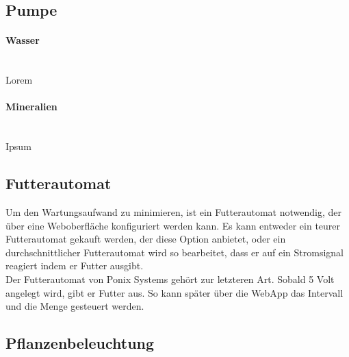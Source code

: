 \documentclass[11pt]{article}
\begin{document}
\subsection{Pumpe}
\paragraph{Wasser}\mbox{} \\
Lorem
\paragraph{Mineralien}\mbox{} \\
Ipsum
\subsection{Futterautomat}
Um den Wartungsaufwand zu minimieren, ist ein Futterautomat notwendig, der \"uber eine Weboberfl\"ache konfiguriert werden kann. Es kann entweder ein teurer Futterautomat gekauft werden, der diese Option anbietet, oder ein durchschnittlicher Futterautomat wird so bearbeitet, dass er auf ein Stromsignal reagiert indem er Futter ausgibt. \\
Der Futterautomat von Ponix Systems geh\"ort zur letzteren Art. Sobald 5 Volt angelegt wird, gibt er Futter aus. So kann sp\"ater \"uber die WebApp das Intervall und die Menge gesteuert werden.
\subsection{Pflanzenbeleuchtung}
\end{document}
